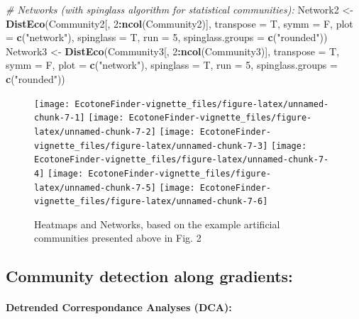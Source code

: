 \documentclass[
]{article}
\newenvironment{Shaded}{\begin{snugshade}}{\end{snugshade}}
\newcommand{\CommentTok}[1]{\textcolor[rgb]{0.56,0.35,0.01}{\textit{#1}}}
\newcommand{\DataTypeTok}[1]{\textcolor[rgb]{0.13,0.29,0.53}{#1}}
\newcommand{\DecValTok}[1]{\textcolor[rgb]{0.00,0.00,0.81}{#1}}
\newcommand{\KeywordTok}[1]{\textcolor[rgb]{0.13,0.29,0.53}{\textbf{#1}}}
\newcommand{\NormalTok}[1]{#1}
\newcommand{\OperatorTok}[1]{\textcolor[rgb]{0.81,0.36,0.00}{\textbf{#1}}}
\newcommand{\StringTok}[1]{\textcolor[rgb]{0.31,0.60,0.02}{#1}}
\begin{document}
\begin{Shaded}
\begin{Highlighting}[]
\CommentTok{\# Networks (with spinglass algorithm for statistical communities):}
\NormalTok{Network2 \textless{}{-}}\StringTok{ }\KeywordTok{DistEco}\NormalTok{(Community2[, }\DecValTok{2}\OperatorTok{:}\KeywordTok{ncol}\NormalTok{(Community2)], }\DataTypeTok{transpose =}\NormalTok{ T, }\DataTypeTok{symm =}\NormalTok{ F, }
    \DataTypeTok{plot =} \KeywordTok{c}\NormalTok{(}\StringTok{"network"}\NormalTok{), }\DataTypeTok{spinglass =}\NormalTok{ T, }\DataTypeTok{run =} \DecValTok{5}\NormalTok{, }\DataTypeTok{spinglass.groups =} \KeywordTok{c}\NormalTok{(}\StringTok{"rounded"}\NormalTok{))}
\NormalTok{Network3 \textless{}{-}}\StringTok{ }\KeywordTok{DistEco}\NormalTok{(Community3[, }\DecValTok{2}\OperatorTok{:}\KeywordTok{ncol}\NormalTok{(Community3)], }\DataTypeTok{transpose =}\NormalTok{ T, }\DataTypeTok{symm =}\NormalTok{ F, }
    \DataTypeTok{plot =} \KeywordTok{c}\NormalTok{(}\StringTok{"network"}\NormalTok{), }\DataTypeTok{spinglass =}\NormalTok{ T, }\DataTypeTok{run =} \DecValTok{5}\NormalTok{, }\DataTypeTok{spinglass.groups =} \KeywordTok{c}\NormalTok{(}\StringTok{"rounded"}\NormalTok{))}
\end{Highlighting}
\end{Shaded}

\begin{figure}
\texttt{[image: EcotoneFinder-vignette\_files/figure-latex/unnamed-chunk-7-1]} \texttt{[image: EcotoneFinder-vignette\_files/figure-latex/unnamed-chunk-7-2]} \texttt{[image: EcotoneFinder-vignette\_files/figure-latex/unnamed-chunk-7-3]} \texttt{[image: EcotoneFinder-vignette\_files/figure-latex/unnamed-chunk-7-4]} \texttt{[image: EcotoneFinder-vignette\_files/figure-latex/unnamed-chunk-7-5]} \texttt{[image: EcotoneFinder-vignette\_files/figure-latex/unnamed-chunk-7-6]} \caption{Heatmaps and Networks, based on the example artificial communities presented above in Fig. 2}\label{fig:unnamed-chunk-7}
\end{figure}

\hypertarget{community-detection-along-gradients}{%
\subsection{Community detection along
gradients:}\label{community-detection-along-gradients}}

\hypertarget{detrended-correspondance-analyses-dca}{%
\paragraph{Detrended Correspondance Analyses
(DCA):}\label{detrended-correspondance-analyses-dca}}
\end{document}

